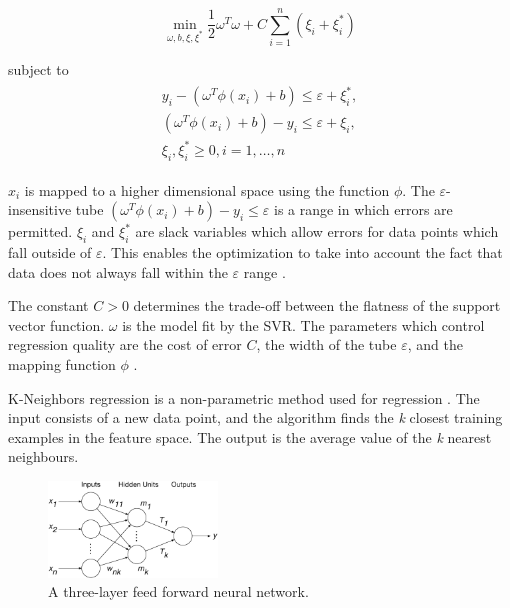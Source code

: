 \documentclass[final,3p,times,twocolumn,numbers]{elsarticle}
\begin{document}
\begin{equation}
\min_{\omega,b,\xi,\xi^{*}}\frac{1}{2}\omega^T\omega+C\sum_{i=1}^{n}(\xi_i+\xi_i^*)
\end{equation}

\noindent subject to
\begin{align}
\begin{multlined}
\label{svr:constrains}
y_i-(\omega^T\phi(x_i)+b)\leq\varepsilon+\xi_i^{*},\\
(\omega^T\phi(x_i)+b)-y_i\leq\varepsilon+\xi_i,\\
\xi_i,\xi^*_i\geq0,i=1,\ldots,n
\end{multlined}
\end{align}

\noindent $x_i$ is mapped to a higher dimensional space using the function $\phi$. The $\varepsilon$-insensitive tube $(\omega^T\phi(x_i)+b)-y_i\leq\varepsilon$ is a range in which errors are permitted. $\xi_i$ and $\xi^*_i$ are slack variables which allow errors for data points which fall outside of $\varepsilon$. This enables the optimization to take into account the fact that data does not always fall within the $\varepsilon$ range \cite{Smola2004}.

The constant $C>0$ determines the trade-off between the flatness of the support vector function. $\omega$ is the model fit by the SVR. The parameters which control regression quality are the cost of error $C$, the width of the tube $\varepsilon$, and the mapping function $\phi$ \cite{Shu2006,Chen2004}. 



K-Neighbors regression is a non-parametric method used for regression \cite{forgy65}. The input consists of a new data point, and the algorithm finds the \textit{k} closest training examples in the feature space. The output is the average value of the \textit{k} nearest neighbours.





\begin{figure}
\centering
    \includegraphics[width=0.4\textwidth]{figures/methods/Kell_eEnergy_Fig1.eps}
    \caption{A three-layer feed forward neural network.}
    \label{fig:mlp}
\end{figure}
\end{document}
